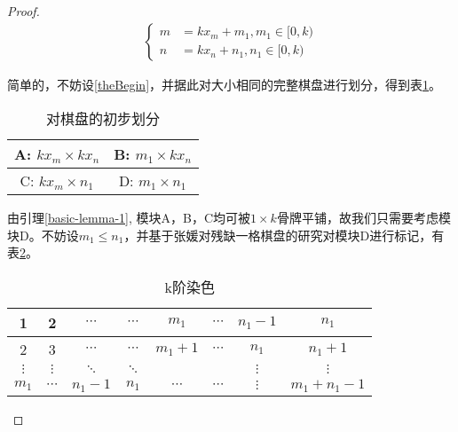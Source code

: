 \begin{proof}
    \begin{align}
        \left\{
        \begin{aligned}
            m & =  kx_m + m_1, m_1 \in [0, k) \\
            n & =  kx_n + n_1, n_1 \in [0, k)
        \end{aligned}
        \right.
        \label{theBegin}
    \end{align}

    简单的，不妨设\ref{theBegin}，并据此对大小相同的完整棋盘进行划分，得到表\ref{fig:first-picture}。

    \begin{table}[h]
        \centering
        \caption{对棋盘的初步划分}
        \begin{tabular}{|c|c|}
            \hline
            A: $kx_m \times kx_n$ & B: $m_1 \times kx_n$ \\
            \hline
            C: $kx_m \times n_1$  & D: $m_1 \times n_1$  \\
            \hline
        \end{tabular}
        \label{fig:first-picture}
    \end{table}

    由引理\ref{basic-lemma-1}, 模块A，B，C均可被$1 \times k$骨牌平铺，故我们只需要考虑模块D。不妨设$m_1 \le n_1$，并基于张媛对残缺一格棋盘的研究\cite{zhangOneStain}对模块D进行标记，有表\ref{fig:k-order-staining-example}。

    \begin{table}[ht]
        \centering
        \caption{k阶染色}
        \begin{tabular}{|c|c|c|c|c|c|c|c|}
            \hline
            1        & 2        & $\cdots$ & $\cdots$ & $m_1$     & $\cdots$ & $n_1 - 1$ & $n_1$           \\
            \hline
            2        & 3        & $\cdots$ & $\cdots$ & $m_1 + 1$ & $\cdots$ & $n_1$     & $n_1 + 1$       \\
            \hline
            $\vdots$ & $\vdots$ & $\ddots$ & $\ddots$ &           &          & $\vdots$  & $\vdots$        \\
            \hline
            $m_1$    & $\cdots$ & $n_1-1$  & $n_1$    & $\cdots$  & $\cdots$ & $\vdots$  & $m_1 + n_1 - 1$ \\
            \hline
        \end{tabular}
        \label{fig:k-order-staining-example}
    \end{table}


\end{proof}
